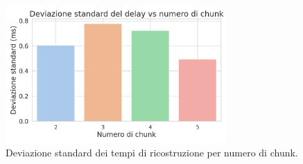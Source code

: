 \documentclass[12pt,a4paper,twoside]{book}
\begin{document}
\begin{figure}[H]

    \centering
    \includegraphics[width=0.75\textwidth]{img/tests/T2/T2-sd.png}
    \caption{Deviazione standard dei tempi di ricostruzione per numero di chunk.}
    \label{fig:segmentation-reconstruction-sd}
\end{figure}
\end{document}
